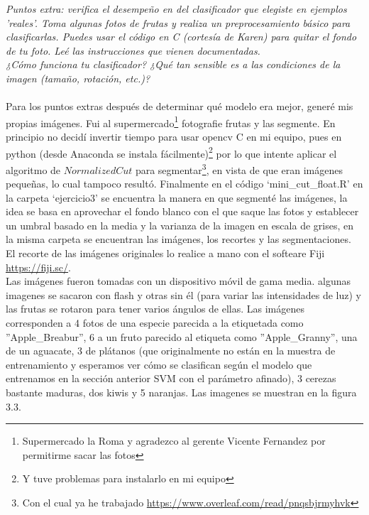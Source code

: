 \documentclass[paper=letter, fontsize=11pt]{scrartcl}
\numberwithin{equation}{section} %
\numberwithin{figure}{section} %
\numberwithin{table}{section} %
\begin{document}
\textit{ Puntos extra: verifica el desempeño en del clasificador que elegiste en ejemplos 'reales'. Toma algunas fotos de frutas y realiza un preprocesamiento básico para clasificarlas. Puedes
usar el código en C (cortesía de Karen) para quitar el fondo de tu foto. Leé las instrucciones que vienen documentadas.\\
¿Cómo funciona tu clasificador? ¿Qué tan sensible es a las condiciones de la imagen (tamaño, rotación, etc.)?}\\\\
Para los puntos extras después de determinar qué modelo era mejor, generé mis propias imágenes. Fui al supermercado\footnote{Supermercado la Roma y agradezco al gerente Vicente Fernandez por permitirme sacar las fotos} fotografie frutas y las segmente. En principio no decidí invertir tiempo para usar opencv C en mi equipo, pues en python (desde Anaconda se instala fácilmente)\footnote{Y tuve problemas para instalarlo en mi equipo} por lo que intente aplicar el algoritmo de $Normalized Cut$ para segmentar\footnote{Con el cual ya he trabajado \url{https://www.overleaf.com/read/pnqsbjrmyhvk}}, en vista de que eran imágenes pequeñas, lo cual tampoco resultó. Finalmente en el código ‘mini\_cut\_float.R’ en la carpeta ‘ejercicio3’ se encuentra la manera en que segmenté las imágenes, la idea se basa en aprovechar el fondo blanco con el que saque las fotos y establecer un umbral basado en la media y la varianza de la imagen en escala de grises, en la misma carpeta se encuentran las imágenes, los recortes y las segmentaciones. El recorte de las imágenes originales lo realice a mano con el softeare Fiji \url{https://fiji.sc/}.\\

Las imágenes fueron tomadas con un dispositivo móvil de gama media. algunas imagenes se sacaron con flash y otras sin él (para variar las intensidades de luz) y las frutas se rotaron para tener varios ángulos de ellas.  Las imágenes corresponden a 4 fotos de una especie parecida a la etiquetada como ''Apple\_Breabur'', 6 a un fruto parecido al etiqueta como ''Apple\_Granny'', una de un aguacate, 3 de plátanos (que originalmente no están en la muestra de entrenamiento y esperamos ver cómo se clasifican según el modelo que entrenamos en la sección anterior SVM con el parámetro afinado), 3 cerezas bastante maduras, dos kiwis y 5 naranjas. Las imagenes se muestran en la figura 3.3.\\
\end{document}
